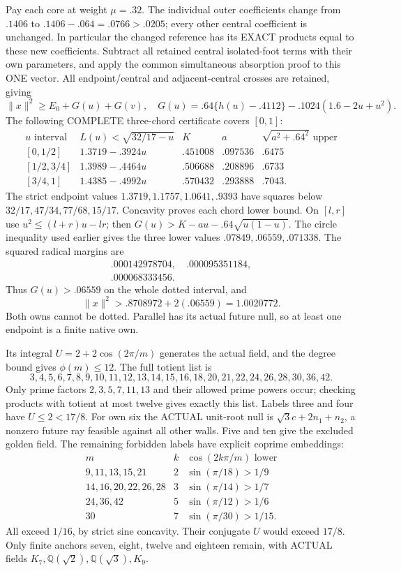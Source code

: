 \documentclass[11pt]{article}
\begin{document}
Pay each core at weight \(\mu=.32\).
The individual outer coefficients change from \(.1406\) to
\(.1406-.064=.0766>.0205\);
every other central coefficient is unchanged.
In particular the changed reference has its EXACT products
equal to these new coefficients.
Subtract all retained central isolated-foot terms with their
own parameters, and apply the common simultaneous absorption
proof to this ONE vector.
All endpoint/central and adjacent-central crosses are retained,
giving
\[
 \|x\|^2\ge E_0+G(u)+G(v),\quad
 G(u)=.64\{h(u)-.4112\}-.1024(1.6-2u+u^2).
\]
The following COMPLETE three-chord certificate covers \([0,1]\):
\[
\begin{array}{c|c|c|c|c}
u\text{ interval}&L(u)<\sqrt{32/17-u}&K&a&
 \sqrt{a^2+.64^2}\text{ upper}\\ \hline
{}[0,1/2]&1.3719-.3924u&.451008&.097536&.6475\\
{}[1/2,3/4]&1.3989-.4464u&.506688&.208896&.6733\\
{}[3/4,1]&1.4385-.4992u&.570432&.293888&.7043 .
\end{array}
\]
The strict endpoint values \(1.3719,\allowbreak1.1757,\allowbreak1.0641,\allowbreak.9393\)
have squares below \(32/17,\allowbreak47/34,\allowbreak77/68,\allowbreak15/17\).
Concavity proves each chord lower bound.
On \([l,r]\) use \(u^2\le(l+r)u-lr\);
then \(G(u)>K-au-.64\sqrt{u(1-u)}\).
The circle inequality used earlier gives the three lower values
\(.07849,\allowbreak.06559,\allowbreak.071338\).
The squared radical margins are
\[
\begin{gathered}
.000142978704,\quad .000095351184,\\
.000068333456.
\end{gathered}
\]
Thus \(G(u)>.06559\) on the whole dotted interval, and
\[
                  \|x\|^2>.8708972+2(.06559)=1.0020772 .
\]
Both owns cannot be dotted.
Parallel has its actual future null, so at least one endpoint
is a finite native own.

Its integral \(U=2+2\cos(2\pi/m)\) generates the actual field,
and the degree bound gives \(\phi(m)\le12\).
The full totient list is
\[
 3,4,5,6,7,8,9,10,11,12,13,14,15,16,
 18,20,21,22,24,26,28,30,36,42 .
\]
Only prime factors \(2,3,5,7,11,13\) and their allowed prime
powers occur; checking products with totient at most twelve
gives exactly this list.
Labels three and four have \(U\le2<17/8\).
For own six the ACTUAL unit-root null is
\(\sqrt3c+2n_1+n_2\), a nonzero future ray feasible against
all other walls.
Five and ten give the excluded golden field.
The remaining forbidden labels have explicit coprime embeddings:
\[
\begin{array}{c|c|c}
m&k&\cos(2k\pi/m)\text{ lower}\\ \hline
9,11,13,15,21&2&\sin(\pi/18)>1/9\\
14,16,20,22,26,28&3&\sin(\pi/14)>1/7\\
24,36,42&5&\sin(\pi/12)>1/6\\
30&7&\sin(\pi/30)>1/15 .
\end{array}
\]
All exceed \(1/16\), by strict sine concavity.
Their conjugate \(U\) would exceed \(17/8\).
Only finite anchors seven, eight, twelve and eighteen remain,
with ACTUAL fields \(K_7,\mathbb Q(\sqrt2),\mathbb Q(\sqrt3),K_9\).
\end{document}
